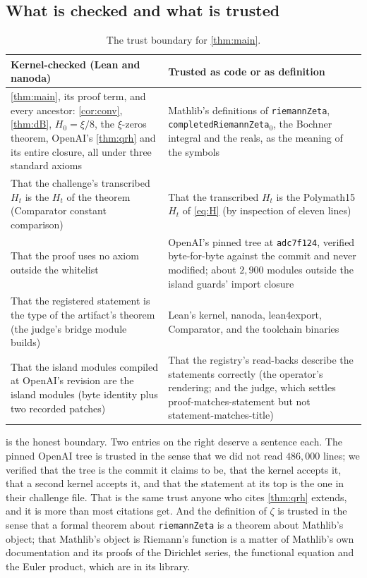 \documentclass[11pt]{article}
\theoremstyle{definition}
\newcommand{\lean}[1]{\texttt{#1}}
\newcommand{\Hfun}{H}
\begin{document}
\subsection{What is checked and what is trusted}

\begin{table}[h]\centering\small
\begin{tabular}{p{}p{}}
\toprule
\textbf{Kernel-checked (Lean and nanoda)} & \textbf{Trusted as code or as definition} \\
\midrule
\cref{thm:main}, its proof term, and every ancestor: \cref{cor:conv}, \cref{thm:dB}, $\Hfun_0 = \xi/8$, the $\xi$-zeros theorem, OpenAI's \cref{thm:qrh} and its entire closure, all under three standard axioms &
Mathlib's definitions of \lean{riemannZeta}, \lean{completedRiemannZeta$_0$}, the Bochner integral and the reals, as the meaning of the symbols \\
\addlinespace
That the challenge's transcribed $\Hfun_t$ is the $\Hfun_t$ of the theorem (Comparator constant comparison) &
That the transcribed $\Hfun_t$ is the Polymath15 $\Hfun_t$ of \cref{eq:H} (by inspection of eleven lines) \\
\addlinespace
That the proof uses no axiom outside the whitelist &
OpenAI's pinned tree at \lean{adc7f124}, verified byte-for-byte against the commit and never modified; about $2{,}900$ modules outside the island guards' import closure \\
\addlinespace
That the registered statement is the type of the artifact's theorem (the judge's bridge module builds) &
Lean's kernel, nanoda, lean4export, Comparator, and the toolchain binaries \\
\addlinespace
That the island modules compiled at OpenAI's revision are the island modules (byte identity plus two recorded patches) &
That the registry's read-backs describe the statements correctly (the operator's rendering; and the judge, which settles proof-matches-statement but not statement-matches-title) \\
\bottomrule
\end{tabular}
\caption{The trust boundary for \cref{thm:main}.}
\label{tab:trust}
\end{table}

 is the honest boundary. Two entries on the right deserve a sentence each. The pinned OpenAI tree is trusted in the sense that we did not read $486{,}000$ lines; we verified that the tree is the commit it claims to be, that the kernel accepts it, that a second kernel accepts it, and that the statement at its top is the one in their challenge file. That is the same trust anyone who cites \cref{thm:qrh} extends, and it is more than most citations get. And the definition of $\zeta$ is trusted in the sense that a formal theorem about \lean{riemannZeta} is a theorem about Mathlib's object; that Mathlib's object is Riemann's function is a matter of Mathlib's own documentation and its proofs of the Dirichlet series, the functional equation and the Euler product, which are in its library.
\end{document}
